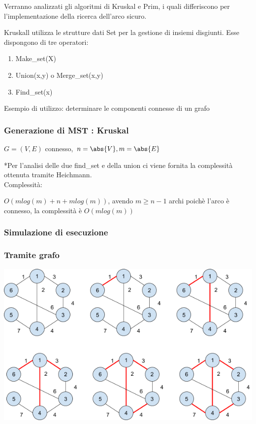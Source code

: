 \documentclass[tikz]{article}
\providecommand{\tightlist}{%
  \setlength{\itemsep}{0pt}\setlength{\parskip}{0pt}}
\begin{document}
{{

{Verranno analizzati gli algoritmi di Kruskal e Prim, i quali differiscono per l'implementazione della ricerca dell'arco sicuro.}

{Kruskall utilizza le strutture dati Set per la gestione di insiemi disgiunti. Esse dispongono di tre operatori:}

\begin{enumerate}
\tightlist
\item
  {Make\_set(X)}
\item
  {Union(x,y) o Merge\_set(x,y)}
\item
  {Find\_set(x)}
\end{enumerate}

{Esempio di utilizzo: determinare le componenti connesse di un grafo}



\subsubsection{Generazione di MST : Kruskal}

$G=(V,E)$ connesso, $n=\abs{V},m=\abs{E}$



{*Per l'analisi delle due find\_set e della union ci viene fornita la complessità ottenuta tramite Heichmann.\\
}{Complessità}{:}

{$O(mlog(m)+n+mlog(m))$, avendo $m \geq n-1$ archi poichè l'arco è connesso, la complessità è $O(mlog(m))$}

\subsubsection{Simulazione di esecuzione}

\subsubsection{Tramite grafo}

{\includegraphics{images/image519.png}}

}}
\end{document}
